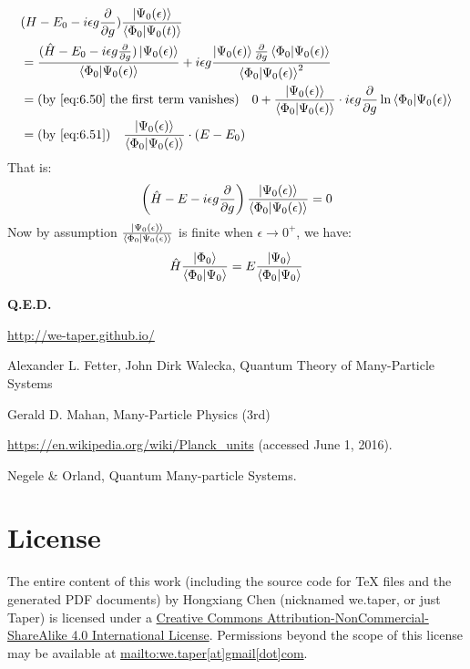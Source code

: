 \documentclass{article}
\numberwithin{equation}{subsection} %
\begin{document}
\begin{align}
&(H-E_0 - i\epsilon g \frac{\partial}{\partial g}) \frac{\ket{\Psi_0(\epsilon)}}
{\braket{\Phi_0|\Psi_0(t)}} \nonumber\\
&= \frac{
	(\hat{H}-E_0-i \epsilon g \frac{\partial}{\partial g})
	\ket{\Psi_0(\epsilon)}
}{
\braket{\Phi_0|\Psi_0(\epsilon)}
}
+ i\epsilon g
\frac{
	\ket{\Psi_0(\epsilon)}\frac{\partial}{\partial g}
	\braket{\Phi_0|\Psi_0(\epsilon)}
}{
\braket{\Phi_0|\Psi_0(\epsilon)}^2
} \nonumber\\
&= \text{(by \ref{eq:6.50} the first term vanishes)\quad} 0
+ \frac{\ket{\Psi_0(\epsilon)}}
{\braket{\Phi_0|\Psi_0(\epsilon)}}
\cdot
i \epsilon g \frac{\partial}{\partial g}
\ln\braket{\Phi_0|\Psi_0(\epsilon)} \nonumber\\
&= \text{(by \ref{eq:6.51})\quad}
\frac{\ket{\Psi_0(\epsilon)}}
{\braket{\Phi_0|\Psi_0(\epsilon)}}
\cdot
(E-E_0)
\end{align}
That is:
\begin{align}
\left( \hat{H} - E - i \epsilon g \frac{\partial}{\partial g}\right) 
\frac{\ket{\Psi_0(\epsilon)}}
{\braket{\Phi_0|\Psi_0(\epsilon)}}
= 0
\end{align}
Now by assumption 
$\frac{\ket{\Psi_0(\epsilon)}}
{\braket{\Phi_0|\Psi_0(\epsilon)}}$ is finite when 
$\epsilon\to 0^+$,
we have:
\begin{align}
\hat{H}\frac{\ket{\Phi_0}}{\braket{\Phi_0|\Psi_0}}
=
E \frac{\ket{\Psi_0}}{\braket{\Phi_0 |\Psi_0}}
\end{align}

\textbf{Q.E.D.}


\begin{thebibliography}{1}

	
	 \url{http://we-taper.github.io/}
	
	 Alexander L. Fetter, John Dirk Walecka, Quantum Theory of Many-Particle Systems
	
	  Gerald D. Mahan, Many-Particle Physics (3rd)
	
	 \url{https://en.wikipedia.org/wiki/Planck_units}
	(accessed June 1, 2016).
	
	 Negele \& Orland, Quantum Many-particle Systems.
	
	
\end{thebibliography}


\section{License}
The entire content of this work (including the source code
for TeX files and the generated PDF documents) by 
Hongxiang Chen (nicknamed we.taper, or just Taper) is
licensed under a 
\href{http://creativecommons.org/licenses/by-nc-sa/4.0/}{Creative 
Commons Attribution-NonCommercial-ShareAlike 4.0 International 
License}. Permissions beyond the scope of this 
license may be available at \url{mailto:we.taper[at]gmail[dot]com}.
\end{document}
